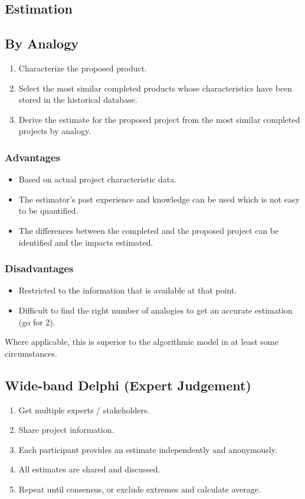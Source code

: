 \documentclass[landscape]{cheat}
\begin{document}
\begin{multicols}{3}
\section{Estimation}
\subsection{By Analogy}
\begin{enumerate}
    \item Characterize the proposed product.
    \item Select the most similar completed products whose characteristics have been stored in the historical database.
    \item Derive the estimate for the proposed project from the most similar completed projects by analogy.
\end{enumerate}
\subsubsection{Advantages}
\begin{itemize}
    \item Based on actual project characteristic data.
    \item The estimator's past experience and knowledge can be used which is not easy to be quantified.
    \item The differences between the completed and the proposed project can be identified and the impacts estimated.
\end{itemize}
\subsubsection{Disadvantages}
\begin{itemize}
    \item Restricted to the information that is available at that point.
    \item Difficult to find the right number of analogies to get an accurate estimation (go for 2).
\end{itemize}
Where applicable, this is superior to the algorithmic model in at least some circumstances.

\subsection{Wide-band Delphi (Expert Judgement)}
\begin{enumerate}
    \item Get multiple experts / stakeholders.
    \item Share project information.
    \item Each participant provides an estimate independently and anonymously.
    \item All estimates are shared and discussed.
    \item Repeat until consensus, or exclude extremes and calculate average.
\end{enumerate}

\end{multicols}
\end{document}
